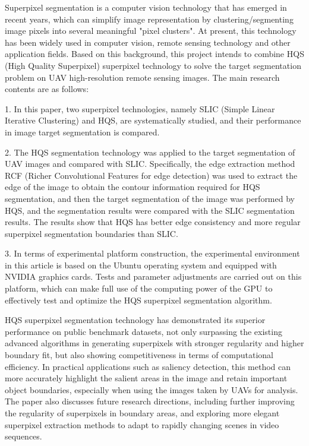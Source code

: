 Superpixel segmentation is a computer vision technology that has emerged in recent years, which can simplify image representation by clustering/segmenting image pixels into several meaningful "pixel clusters". At present, this technology has been widely used in computer vision, remote sensing technology and other application fields. Based on this background, this project intends to combine HQS (High Quality Superpixel) superpixel technology to solve the target segmentation problem on UAV high-resolution remote sensing images. The main research contents are as follows:

1. In this paper, two superpixel technologies, namely SLIC (Simple Linear Iterative Clustering) and HQS, are systematically studied, and their performance in image target segmentation is compared.

2. The HQS segmentation technology was applied to the target segmentation of UAV images and compared with SLIC. Specifically, the edge extraction method RCF (Richer Convolutional Features for edge detection) was used to extract the edge of the image to obtain the contour information required for HQS segmentation, and then the target segmentation of the image was performed by HQS, and the segmentation results were compared with the SLIC segmentation results. The results show that HQS has better edge consistency and more regular superpixel segmentation boundaries than SLIC.

3. In terms of experimental platform construction, the experimental environment in this article is based on the Ubuntu operating system and equipped with NVIDIA graphics cards. Tests and parameter adjustments are carried out on this platform, which can make full use of the computing power of the GPU to effectively test and optimize the HQS superpixel segmentation algorithm.

HQS superpixel segmentation technology has demonstrated its superior performance on public benchmark datasets, not only surpassing the existing advanced algorithms in generating superpixels with stronger regularity and higher boundary fit, but also showing competitiveness in terms of computational efficiency. In practical applications such as saliency detection, this method can more accurately highlight the salient areas in the image and retain important object boundaries, especially when using the images taken by UAVs for analysis. The paper also discusses future research directions, including further improving the regularity of superpixels in boundary areas, and exploring more elegant superpixel extraction methods to adapt to rapidly changing scenes in video sequences.
